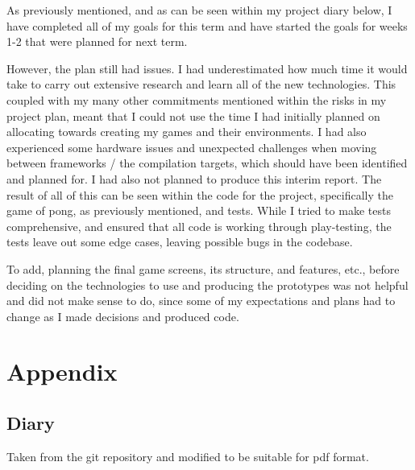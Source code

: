 \documentclass[]{final}
\begin{document}
As previously mentioned, and as can be seen within my project diary below,
I have completed all of my goals for this term and have
started the goals for weeks 1-2 that were planned for next term.

However, the plan still had issues. I had underestimated how much time it would
take to carry out extensive research and learn all of the new technologies. This
coupled with my many other commitments mentioned within the risks in my project plan,
meant that I could not use the time I had initially planned on allocating towards
creating my games and their environments. I had also experienced some hardware
issues and unexpected challenges when moving between frameworks / the compilation
targets, which should have been identified and planned for. I had also not planned to
produce this interim report. The result of all of this can be seen within the
code for the project, specifically the game of pong, as previously mentioned, and tests. While I tried to make tests comprehensive,
and ensured that all code is working through play-testing, the tests leave out
some edge cases, leaving possible bugs in the codebase.

To add, planning the final game screens, its structure, and features, etc., before
deciding on the technologies to use and producing the prototypes was not helpful and
did not make sense to do, since some of my expectations and plans had to change as I
made decisions and produced code.


\newpage
{}


\chapter{Appendix}
\section{Diary}
Taken from the git repository and modified to be suitable for pdf format.
\end{document}

